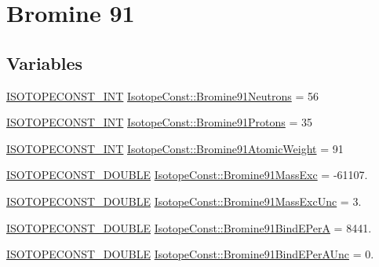 \hypertarget{group___isotope_const-_bromine-_br91}{}\section{Bromine 91}
\label{group___isotope_const-_bromine-_br91}
\subsection*{Variables}
\begin{DoxyCompactItemize}
\item 
\mbox{\hyperlink{group___isotope_const-_macros_ga5f18360b3e99483a35c32d789e62621c}{I\+S\+O\+T\+O\+P\+E\+C\+O\+N\+S\+T\+\_\+\+I\+NT}} \mbox{\hyperlink{group___isotope_const-_bromine-_br91_ga0d3563fbf6da865fd8ed6aad7cd535a3}{Isotope\+Const\+::\+Bromine91\+Neutrons}} = 56
\item 
\mbox{\hyperlink{group___isotope_const-_macros_ga5f18360b3e99483a35c32d789e62621c}{I\+S\+O\+T\+O\+P\+E\+C\+O\+N\+S\+T\+\_\+\+I\+NT}} \mbox{\hyperlink{group___isotope_const-_bromine-_br91_ga5c98405b62ac5729d62b43ed0e02926a}{Isotope\+Const\+::\+Bromine91\+Protons}} = 35
\item 
\mbox{\hyperlink{group___isotope_const-_macros_ga5f18360b3e99483a35c32d789e62621c}{I\+S\+O\+T\+O\+P\+E\+C\+O\+N\+S\+T\+\_\+\+I\+NT}} \mbox{\hyperlink{group___isotope_const-_bromine-_br91_ga8f44e194ada41a1c0dd26bc247c471b8}{Isotope\+Const\+::\+Bromine91\+Atomic\+Weight}} = 91
\item 
\mbox{\hyperlink{group___isotope_const-_macros_ga8f45a7272ce02c0b4c65c44636ed719a}{I\+S\+O\+T\+O\+P\+E\+C\+O\+N\+S\+T\+\_\+\+D\+O\+U\+B\+LE}} \mbox{\hyperlink{group___isotope_const-_bromine-_br91_ga81c374a3db537bea8c95ec8976491759}{Isotope\+Const\+::\+Bromine91\+Mass\+Exc}} = -\/61107.
\item 
\mbox{\hyperlink{group___isotope_const-_macros_ga8f45a7272ce02c0b4c65c44636ed719a}{I\+S\+O\+T\+O\+P\+E\+C\+O\+N\+S\+T\+\_\+\+D\+O\+U\+B\+LE}} \mbox{\hyperlink{group___isotope_const-_bromine-_br91_ga6cea7abd4e29b933af68741b25c5932c}{Isotope\+Const\+::\+Bromine91\+Mass\+Exc\+Unc}} = 3.
\item 
\mbox{\hyperlink{group___isotope_const-_macros_ga8f45a7272ce02c0b4c65c44636ed719a}{I\+S\+O\+T\+O\+P\+E\+C\+O\+N\+S\+T\+\_\+\+D\+O\+U\+B\+LE}} \mbox{\hyperlink{group___isotope_const-_bromine-_br91_ga4e66d0cdd450c5d32017cf8458b886d4}{Isotope\+Const\+::\+Bromine91\+Bind\+E\+PerA}} = 8441.
\item 
\mbox{\hyperlink{group___isotope_const-_macros_ga8f45a7272ce02c0b4c65c44636ed719a}{I\+S\+O\+T\+O\+P\+E\+C\+O\+N\+S\+T\+\_\+\+D\+O\+U\+B\+LE}} \mbox{\hyperlink{group___isotope_const-_bromine-_br91_ga24e4e7677249d0be679186a54b0c6787}{Isotope\+Const\+::\+Bromine91\+Bind\+E\+Per\+A\+Unc}} = 0.

\end{DoxyCompactItemize}
